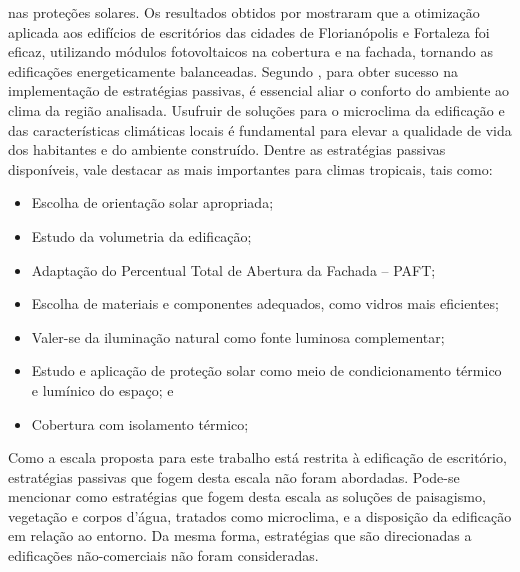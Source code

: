 nas proteções solares. Os resultados obtidos por \textcite{Didone2014a} mostraram que 
a otimização aplicada aos edifícios de escritórios das cidades de Florianópolis e 
Fortaleza foi eficaz, utilizando módulos fotovoltaicos na cobertura e na fachada, 
tornando as edificações energeticamente balanceadas.\vspace*{0.3cm} \newline
Segundo \textcite{Noguchi2016}, para obter sucesso na implementação de estratégias passivas, 
é essencial aliar o conforto do ambiente ao clima da região analisada. Usufruir 
de soluções para o microclima da edificação e das características climáticas locais 
é fundamental para elevar a qualidade de vida dos habitantes e do ambiente construído. 
Dentre as estratégias passivas disponíveis, vale destacar as mais importantes para 
climas tropicais, tais como:
\begin{itemize}
    \item Escolha de orientação solar apropriada;
    \item Estudo da volumetria da edificação;
    \item Adaptação do Percentual Total de Abertura da Fachada – PAFT;
    \item Escolha de materiais e componentes adequados, como vidros mais eficientes;
    \item Valer-se da iluminação natural como fonte luminosa complementar;
    \item Estudo e aplicação de proteção solar como meio de condicionamento térmico e lumínico do espaço; e
    \item Cobertura com isolamento térmico;    
\end{itemize}
Como a escala proposta para este trabalho está restrita à edificação de escritório, 
estratégias passivas que fogem desta escala não foram abordadas. Pode-se mencionar como 
estratégias que fogem desta escala as soluções de paisagismo, vegetação e corpos d’água, 
tratados como microclima, e a disposição da edificação em relação ao entorno. Da mesma 
forma, estratégias que são direcionadas a edificações não-comerciais não foram consideradas.